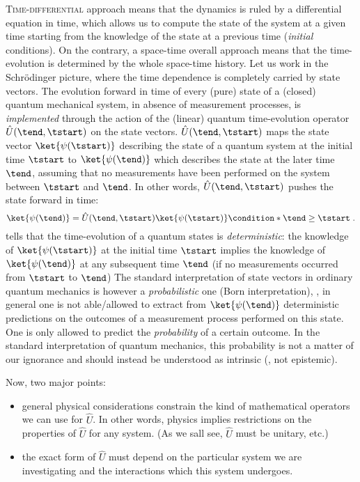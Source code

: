 
\lettrine{T}{ime-differential} approach means that the dynamics is ruled by a
differential equation in time, which allows us to compute the state of the
system at a given time starting from the knowledge of the state at a previous
time (\emph{initial} conditions).
On the contrary, a space-time overall approach means that 
the time-evolution is determined by the whole space-time history.
%
Let us work in the Schr\"odinger picture, where the time dependence is
completely carried by state vectors.  The evolution forward in time of every
(pure) state of a (closed) quantum mechanical system, in absence of measurement
processes, is \emph{implemented} through the action of the (linear) quantum
time-evolution operator $\hat{U}(\tend, \tstart)$ on the state vectors.
$\hat{U}(\tend, \tstart)$ maps the state vector $\ket{\psi(\tstart)}$ describing
the state of a quantum system at the initial time $\tstart$ to
$\ket{\psi(\tend)}$ which describes the state at the later time $\tend$,
assuming  that no measurements have been  performed on the system between
$\tstart$ and $\tend$.  In other words, $\hat{U}(\tend, \tstart)$ pushes the
state forward in time:
\begin{equation}\label{eq:intro:U}
   \ket{\psi(\tend)} = \hat{U}(\tend, \tstart) \ket{\psi(\tstart)}
   \condition*{\tend\geq\tstart} \; .
\end{equation}
 tells that the time-evolution of a quantum states is
\emph{deterministic}: the knowledge of $\ket{\psi(\tstart)}$ at the initial time
$\tstart$ implies the knowledge of $\ket{\psi(\tend)}$ at any subsequent time
$\tend$ (if no measurements occurred from $\tstart$ to $\tend$) The standard
interpretation of state vectors in ordinary quantum mechanics is however a
\emph{probabilistic} one (Born interpretation), \ie, in general one is not
able/allowed
to extract from $\ket{\psi(\tend)}$ deterministic predictions on the outcomes of
a measurement process performed on this state. One is only allowed to 
predict the \emph{probability} of a certain outcome. In the standard
interpretation of quantum
mechanics, this probability is not a matter of our ignorance and should instead
be understood as intrinsic
(\ie, not epistemic).

Now, two major points:
\begin{itemize}
   \item general physical considerations constrain the kind of mathematical
      operators we can use for $\hat{U}$. In other words, physics implies
      restrictions on the properties of $\hat{U}$ for any system.
     (As we sall see, $\hat{U}$ must be unitary, etc.)
   \item the exact form of $\hat{U}$ must depend on the particular system we
      are investigating and the interactions which this system undergoes.
\end{itemize}


